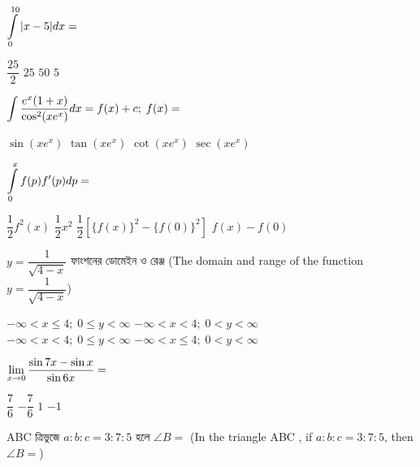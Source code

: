 \documentclass[addpoints]{exam}
\begin{document}
\begin{questions}
\begin{oneparchoices}
\end{oneparchoices}

\question $ \mathlarger{\int\limits_{0}^{10}|x-5|dx=} $  

\begin{oneparchoices}
\choice $ \dfrac{25}{2} $
\choice $ 25 $
\choice $ 50 $
\choice $ 5 $

\end{oneparchoices}

\question  $ \mathlarger{\int\dfrac{e^{x}(1+x)}{\cos^{2}(xe^{x})}dx = f(x) + c;\; f(x) = }$

\begin{oneparchoices}
\choice $ \sin (xe^{x}) $
\choice $ \tan(xe^{x}) $
\choice $ \cot(xe^{x}) $
\choice  $ \sec(xe^{x}) $

\end{oneparchoices}


\question  $ \mathlarger{\int\limits_{0}^{x}f(p)f^{\prime}(p)dp = } $

\begin{oneparchoices}
\choice $ \dfrac{1}{2}f^{2}(x) $
\choice $ \dfrac{1}{2}x^{2} $
\choice $ \dfrac{1}{2}[\{f(x)\}^{2} - \{f(0)\}^{2}] $
\choice  $ f(x)-f(0) $

\end{oneparchoices}

\question  $ y= \dfrac{1}{\sqrt{4-x}} $ ফাংশনের ডোমেইন ও রেঞ্জ (The domain and range of the function $ y= \dfrac{1}{\sqrt{4-x}} $)
\begin{oneparchoices}
\choice $ -\infty< x\le 4;\;  0\le y<\infty $
\hspace*{.7cm} \choice $ -\infty< x< 4;\;  0< y<\infty $\\
\hspace*{-.45cm} \choice $ -\infty< x< 4;\;  0\le y<\infty $
\hspace*{.7cm} \choice $ -\infty< x\le 4;\;  0< y<\infty $

\end{oneparchoices}

\question   $ \mathlarger{\lim\limits_{x\to 0}\dfrac{\sin 7x -\sin x}{\sin 6x} = } $

\begin{oneparchoices}
\choice $ \dfrac{7}{6} $
\choice $ -\dfrac{7}{6} $
\choice $ 1 $
\choice $ -1 $

\end{oneparchoices}

\question ABC ত্রিভুজে $ a:b:c = 3:7:5 $ হলে $ \angle B = $ (In the triangle ABC , if $ a:b:c = 3:7:5 $, then $ \angle B = $)


\end{questions}
\end{document}
